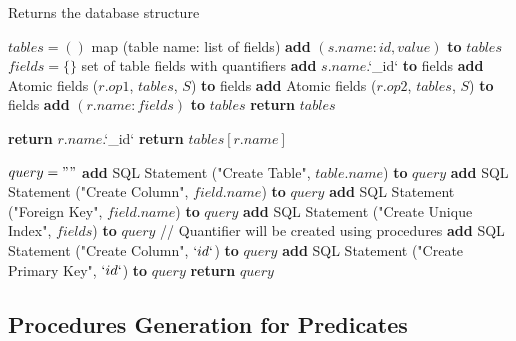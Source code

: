 \documentclass[oneside]{book}
\begin{document}
\begin{algorithm}
\caption{Returns the database structure}

\label{array-sum0}
\begin{algorithmic}[1]
	\State $tables = ()$ \Comment map (table name: list of fields)
		\State \textbf{add} $(s.name: {id, value})$ \textbf{to} $tables$
			\State $fields = \{\}$ \Comment set of table fields with quantifiers
			\State \textbf{add} $s.name$.`\_id` \textbf{to} fields
			\State \textbf{add} Atomic fields ($r.op1$, $tables$, $S$) \textbf{to} fields
				\State \textbf{add} Atomic fields ($r.op2$, $tables$, $S$) \textbf{to} fields
			\EndIf
			\State \textbf{add} $(r.name: fields)$ \textbf{to} $tables$
		\EndFor
	\EndFor
	\State \textbf{return} $tables$
\EndFunction
\end{algorithmic}

\label{array-sum1}
\begin{algorithmic}[1]
				\State \textbf{return} $r.name$.`\_id`
			\EndIf
			\State \textbf{return} $tables[r.name]$
\EndFunction
\end{algorithmic}

\label{array-sum2}
\begin{algorithmic}[1]
	\State $query = ""$
		\State \textbf{add} SQL Statement ("Create Table", $table.name$) \textbf{to} $query$
			\State \textbf{add} SQL Statement ("Create Column", $field.name$) \textbf{to} $query$
			\State \textbf{add} SQL Statement ("Foreign Key", $field.name$) \textbf{to} $query$
			 \State \textbf{add} SQL Statement ("Create Unique Index", $fields$) \textbf{to} $query$
			\EndIf
			 \State // Quantifier will be created using procedures
			\EndIf
		\EndFor
		\State \textbf{add} SQL Statement ("Create Column", $`id`$) \textbf{to} $query$
		\State \textbf{add} SQL Statement ("Create Primary Key", $`id`$) \textbf{to} $query$
	\EndFor
			\State \textbf{return} $query$
\EndFunction
\end{algorithmic}

\end{algorithm}

\newpage

\subsection{Procedures Generation for Predicates}
\end{document}

